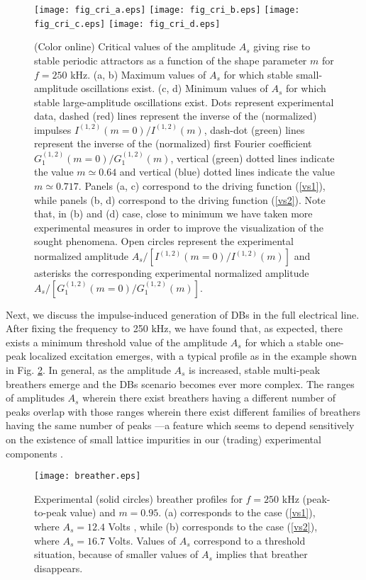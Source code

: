 \documentclass[showpacs,preprintnumbers,10pt,onecolumn]{revtex4}%
\begin{document}
\begin{figure}[h]
\texttt{[image: fig\_cri\_a.eps]}
\texttt{[image: fig\_cri\_b.eps]}
\texttt{[image: fig\_cri\_c.eps]}
\texttt{[image: fig\_cri\_d.eps]}
\caption{(Color online) Critical values
of the amplitude $A_{s}$ giving rise to stable periodic attractors as a
function of the shape parameter $m$ for $f=250$ kHz. (a, b) Maximum values of
$A_{s}$ for which stable small-amplitude oscillations exist. (c, d) Minimum
values of $A_{s}$ for which stable large-amplitude oscillations exist. Dots represent experimental data, dashed (red) lines
represent the inverse of the (normalized) impulses $I^{(1,2)}(m=0)/I^{(1,2)}(m)$, dash-dot (green) lines represent
the inverse of the (normalized) first Fourier coefficient $G^{(1,2)}_1(m=0)/G^{(1,2)}_1(m)$, vertical (green) dotted lines indicate the value $m\simeq0.64$
and vertical (blue) dotted lines indicate the value $m\simeq0.717$. Panels
(a, c) correspond to the driving function (\ref{vs1}), while panels (b, d)
correspond to the driving function (\ref{vs2}). Note that, in (b) and (d) case, close to minimum we have taken more experimental measures
in order to improve the visualization of the sought phenomena. Open circles represent the experimental normalized amplitude $A_{s}/[I^{(1,2)}(m=0)/I^{(1,2)}(m)]$ and 
asterisks the corresponding experimental normalized amplitude $A_{s}/[G^{(1,2)}_1(m=0)/G^{(1,2)}_1(m)]$.}%
\label{fig_cri}%
\end{figure}

Next, we discuss the impulse-induced generation of DBs in the full
electrical line. After fixing the frequency to 250 kHz, we have found that, as expected, there exists a
minimum threshold value of the amplitude $A_{s}$ for which a stable one-peak
localized excitation emerges, with a typical profile as in the
example shown in Fig. \ref{breather}. In general, as the amplitude $A_{s}$ is
increased, stable multi-peak breathers emerge and the DBs scenario becomes
ever more complex. The ranges of
amplitudes $A_{s}$ wherein there exist breathers having a different number of
peaks overlap with those ranges wherein there exist different families of
breathers having the same number of peaks ---a feature which seems to depend
sensitively on the existence of small lattice impurities in our (trading)
experimental components \cite{electric1}.

\begin{figure}[h]
\texttt{[image: breather.eps]}
\caption{Experimental (solid circles) breather profiles
for $f=250$ kHz (peak-to-peak value) and $m=0.95$.  (a) corresponds to the case (\ref{vs1}), where $A_{s}=12.4$ Volts
, while (b) corresponds to the case (\ref{vs2}), where $A_{s}=16.7$ Volts. Values of $A_{s}$ correspond to a threshold situation, because
of smaller values of $A_{s}$ implies that breather disappears.}%
\label{breather}%
\end{figure}
\end{document}
